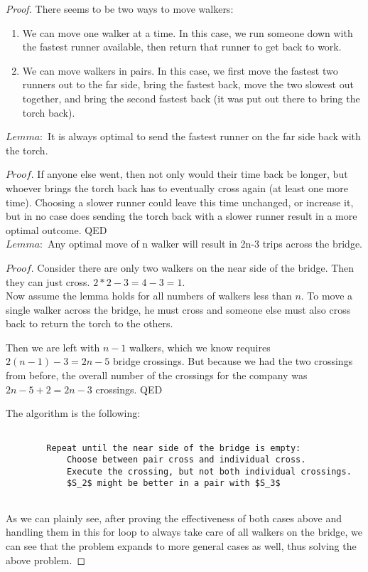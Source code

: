 \documentclass{article}
\begin{document}
\begin{proof}	
	There seems to be two ways to move walkers:
	\begin{enumerate}
		\item We can move one walker at a time.  In this case, we run someone down with the fastest runner available, then return that runner to get back to work.
		\item We can move walkers in pairs.  In this case, we first move the fastest two runners out to the far side, bring the fastest back, move the two slowest out together, and bring the second fastest back (it was put out there to  bring the torch back).
	\end{enumerate}

	$Lemma: $ It is always optimal to send the fastest runner on the far side back with the torch.
	
	$Proof.$ If anyone else went, then not only would their time back be longer, but whoever brings the torch back has to eventually cross again (at least one more time).  Choosing a slower runner could leave this time unchanged, or increase it, but in no case does sending the torch back with a slower runner result in a more optimal outcome.  QED\\
	
	$Lemma: $ Any optimal move of n walker will result in 2n-3 trips across the bridge.
	
	$Proof.$ Consider there are only two walkers on the near side of the bridge.  Then they can just cross.  $2*2 - 3 = 4 - 3 = 1$.\\
	
	Now assume the lemma holds for all numbers of walkers less than $n$.  To move a single walker across the bridge, he must cross and someone else must also cross back to return the torch to the others.
	
	Then we are left with $n - 1$ walkers, which we know requires $2(n-1) - 3 = 2n - 5$ bridge crossings.  But because we had the two crossings from before, the overall number of the crossings for the company was $2n - 5 + 2 = 2n - 3$ crossings.  QED
	
	The algorithm is the following:
	
	\begin{lstlisting}
	
		Repeat until the near side of the bridge is empty:
			Choose between pair cross and individual cross.
			Execute the crossing, but not both individual crossings.
			$S_2$ might be better in a pair with $S_3$
	
	\end{lstlisting}
	
	As we can plainly see, after proving the effectiveness of both cases above and handling them in this for loop to always take care of all walkers on the bridge, we can see that the problem expands to more general cases as well, thus solving the above problem.
	
\end{proof}
\end{document}
